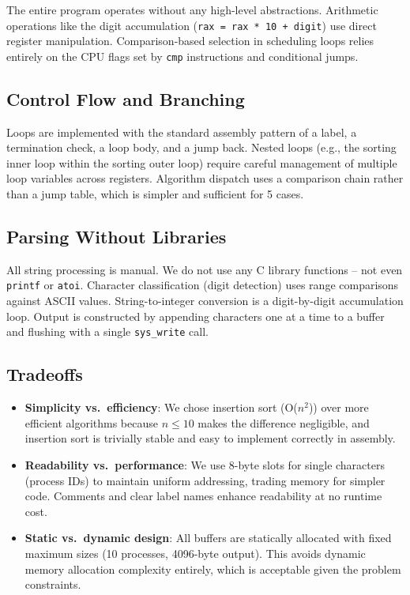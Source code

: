 \documentclass[a4paper,12pt]{article}
\begin{document}
The entire program operates without any high-level abstractions. Arithmetic operations like the digit accumulation (\texttt{rax = rax * 10 + digit}) use direct register manipulation. Comparison-based selection in scheduling loops relies entirely on the CPU flags set by \texttt{cmp} instructions and conditional jumps.

\subsection{Control Flow and Branching}

Loops are implemented with the standard assembly pattern of a label, a termination check, a loop body, and a jump back. Nested loops (e.g., the sorting inner loop within the sorting outer loop) require careful management of multiple loop variables across registers. Algorithm dispatch uses a comparison chain rather than a jump table, which is simpler and sufficient for 5 cases.

\subsection{Parsing Without Libraries}

All string processing is manual. We do not use any C library functions -- not even \texttt{printf} or \texttt{atoi}. Character classification (digit detection) uses range comparisons against ASCII values. String-to-integer conversion is a digit-by-digit accumulation loop. Output is constructed by appending characters one at a time to a buffer and flushing with a single \texttt{sys\_write} call.

\subsection{Tradeoffs}

\begin{itemize}
    \item \textbf{Simplicity vs.\ efficiency}: We chose insertion sort (O($n^2$)) over more efficient algorithms because $n \leq 10$ makes the difference negligible, and insertion sort is trivially stable and easy to implement correctly in assembly.
    \item \textbf{Readability vs.\ performance}: We use 8-byte slots for single characters (process IDs) to maintain uniform addressing, trading memory for simpler code. Comments and clear label names enhance readability at no runtime cost.
    \item \textbf{Static vs.\ dynamic design}: All buffers are statically allocated with fixed maximum sizes (10 processes, 4096-byte output). This avoids dynamic memory allocation complexity entirely, which is acceptable given the problem constraints.
\end{itemize}
\end{document}
